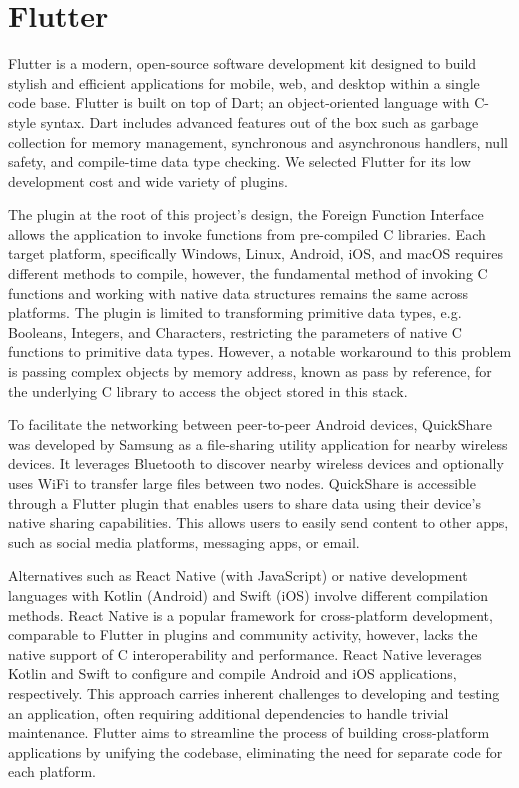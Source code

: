 \section{Flutter}
Flutter is a modern, open-source software development kit designed to build stylish and efficient applications for mobile, web, and desktop within a single code base. Flutter is built on top of Dart; an object-oriented language with C-style syntax. Dart includes advanced features out of the box such as garbage collection for memory management, synchronous and asynchronous handlers, null safety, and compile-time data type checking. We selected Flutter for its low development cost and wide variety of plugins.

The plugin at the root of this project's design, the Foreign Function Interface allows the application to invoke functions from pre-compiled C libraries. Each target platform, specifically Windows, Linux, Android, iOS, and macOS requires different methods to compile, however, the fundamental method of invoking C functions and working with native data structures remains the same across platforms. The plugin is limited to transforming primitive data types, e.g. Booleans, Integers, and Characters, restricting the parameters of native C functions to primitive data types. However, a notable workaround to this problem is passing complex objects by memory address, known as pass by reference, for the underlying C library to access the object stored in this stack. 

To facilitate the networking between peer-to-peer Android devices, QuickShare \cite{samsung_quick_2020} was developed by Samsung as a file-sharing utility application for nearby wireless devices. It leverages Bluetooth to discover nearby wireless devices and optionally uses WiFi to transfer large files between two nodes. QuickShare is accessible through a Flutter plugin that enables users to share data using their device's native sharing capabilities. This allows users to easily send content to other apps, such as social media platforms, messaging apps, or email.

Alternatives such as React Native (with JavaScript) or native development languages with Kotlin (Android) and Swift (iOS) involve different compilation methods. React Native is a popular framework for cross-platform development, comparable to Flutter in plugins and community activity, however, lacks the native support of C interoperability and performance. React Native leverages Kotlin and Swift to configure and compile Android and iOS applications, respectively. This approach carries inherent challenges to developing and testing an application, often requiring additional dependencies to handle trivial maintenance. Flutter aims to streamline the process of building cross-platform applications by unifying the codebase, eliminating the need for separate code for each platform. 
